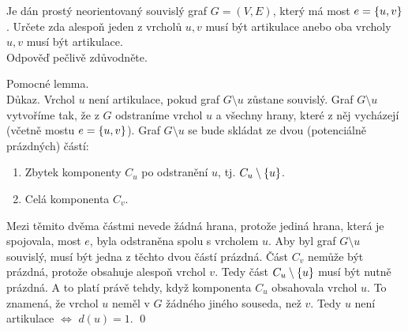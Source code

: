 \documentclass[11pt,a4paper]{article}
\begin{document}
\title{}
\author{Jakub Adamec\\XP01TGR}

\maketitle

\begin{exercise}
Je dán prostý neorientovaný souvislý graf $G = (V,E)$, který má most $e = \left\lbrace u,v \right\rbrace$. Určete zda alespoň jeden z vrcholů
$u,v$ musí být artikulace anebo oba vrcholy $u,v$ musí být artikulace.\\
Odpověď pečlivě zdůvodněte.
\end{exercise}
\begin{solution}
Pomocné lemma. \\
Důkaz. Vrchol $u$ není artikulace, pokud graf $G \setminus u$ zůstane souvislý. Graf $G \setminus u$ vytvoříme tak, že z 
$G$ odstraníme vrchol $u$ a všechny hrany, které z něj vycházejí (včetně mostu $e = \left\lbrace u,v \right\rbrace$). Graf $G \setminus u$ se 
bude skládat ze dvou (potenciálně prázdných) částí:
\begin{enumerate}[(1), noitemsep]
    \item Zbytek komponenty $C_u$ po odstranění $u$, tj. $C_u \setminus \left\lbrace u \right\rbrace$.
    \item Celá komponenta $C_v$.
\end{enumerate}
Mezi těmito dvěma částmi nevede žádná hrana, protože jediná hrana, která je spojovala, most $e$, byla odstraněna spolu s 
vrcholem $u$. Aby byl graf $G \setminus u$ souvislý, musí být jedna z těchto dvou částí prázdná.  Část $C_v$ nemůže být 
prázdná, protože obsahuje alespoň vrchol $v$.  Tedy část $C_u \setminus \left\lbrace u \right\rbrace$ musí být nutně prázdná. A to platí právě 
tehdy, když komponenta $C_u$ obsahovala  vrchol $u$. To znamená, že vrchol $u$ neměl v $G$ žádného jiného 
souseda, než $v$. Tedy $u$ není artikulace $\iff$ $d(u)=1$. 
\hspace{\fill}\qed 


\end{solution}
\end{document}
